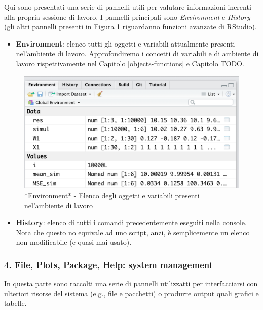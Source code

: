 \documentclass[
]{book}
\providecommand{\tightlist}{%
  \setlength{\itemsep}{0pt}\setlength{\parskip}{0pt}}
\begin{document}
Qui sono presentati una serie di pannelli utili per valutare informazioni inerenti alla propria sessione di lavoro. I pannelli principali sono \emph{Environment} e \emph{History} (gli altri pannelli presenti in Figura \ref{fig:environment} riguardanno funzioni avanzate di RStudio).

\begin{itemize}
\tightlist
\item
  \textbf{Environment}: elenco tutti gli oggetti e variabili attualmente presenti nel'ambiente di lavoro. Approfondiremo i concetti di variabili e di ambiente di lavoro rispettivamente nel Capitolo \ref{objects-functions} e Capitolo TODO.
\end{itemize}

\begin{figure}

{\centering \includegraphics[width=0.6\linewidth]{images/environment} 

}

\caption{*Environment* - Elenco degli oggetti e variabili presenti nel'ambiente di lavoro}\label{fig:environment}
\end{figure}

\begin{itemize}
\tightlist
\item
  \textbf{History}: elenco di tutti i comandi precedentemente eseguiti nella console. Nota che questo no equivale ad uno script, anzi, è semplicemente un elenco non modificabile (e quasi mai usato).
\end{itemize}

\hypertarget{file-plots-package-help-system-management}{%
\subsubsection*{4. File, Plots, Package, Help: system management}\label{file-plots-package-help-system-management}}

In questa parte sono raccolti una serie di pannelli utilizzatti per interfacciarsi con ulteriori risorse del sistema (e.g., file e pacchetti) o produrre output quali grafici e tabelle.
\end{document}
